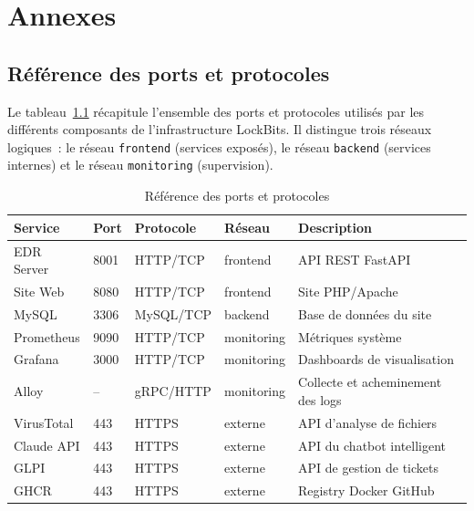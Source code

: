 
\chapter{Annexes}

\section{Référence des ports et protocoles}

Le tableau~\ref{tab:ports-protocoles} récapitule l'ensemble des ports et
protocoles utilisés par les différents composants de l'infrastructure
LockBits. Il distingue trois réseaux logiques~: le réseau \texttt{frontend}
(services exposés), le réseau \texttt{backend} (services internes) et le
réseau \texttt{monitoring} (supervision).

\begin{table}[htbp]
  \centering
  \caption{Référence des ports et protocoles}
  \label{tab:ports-protocoles}
  \begin{tabular}{llllp{5cm}}
    \toprule
    \textbf{Service} & \textbf{Port} & \textbf{Protocole} & \textbf{Réseau} & \textbf{Description} \\
    \midrule
    EDR Server       & 8001 & HTTP/TCP   & frontend   & API REST FastAPI \\
    Site Web         & 8080 & HTTP/TCP   & frontend   & Site PHP/Apache \\
    MySQL            & 3306 & MySQL/TCP  & backend    & Base de données du site \\
    Prometheus       & 9090 & HTTP/TCP   & monitoring & Métriques système \\
    Grafana          & 3000 & HTTP/TCP   & monitoring & Dashboards de visualisation \\
    Alloy            & --   & gRPC/HTTP  & monitoring & Collecte et acheminement des logs \\
    VirusTotal       & 443  & HTTPS      & externe     & API d'analyse de fichiers \\
    Claude API       & 443  & HTTPS      & externe     & API du chatbot intelligent \\
    GLPI             & 443  & HTTPS      & externe     & API de gestion de tickets \\
    GHCR             & 443  & HTTPS      & externe     & Registry Docker GitHub \\
    \bottomrule
  \end{tabular}
\end{table}

